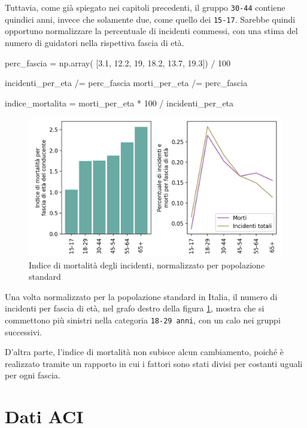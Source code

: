 \documentclass[a4paper,12pt]{report}
\newcommand{\columnstyle}[1]{\texttt{#1}}
\begin{document}
Tuttavia, come già spiegato nei capitoli precedenti, il gruppo \columnstyle{30-44} 
contiene quindici anni, invece che solamente due, come quello dei \columnstyle{15-17}. 
Sarebbe quindi opportuno 
normalizzare la percentuale di incidenti commessi, con una stima del numero di 
guidatori nella rispettiva fascia di età. 

\begin{code}
perc_fascia = np.array( [3.1, 12.2, 19, 18.2, 13.7, 19.3]) / 100

incidenti_per_eta /= perc_fascia
morti_per_eta /= perc_fascia

indice_mortalita = morti_per_eta * 100 / incidenti_per_eta
\end{code}

\begin{figure}
    \includegraphics[width=\linewidth]{../src/incidenti/incidenti_senza_coords/mortalita/indice_mort_norm.png}
    \caption{Indice di mortalità degli incidenti, normalizzato per popolazione standard}
    \label{fig:indice-mort-norm}
\end{figure}

Una volta normalizzato per la popolazione standard in Italia, il numero di incidenti per 
fascia di età, nel grafo destro della figura \ref{fig:indice-mort-norm}, mostra che  
si commettono più sinistri nella categoria \columnstyle{18-29 anni}, 
con un calo nei gruppi successivi. 

D'altra parte, l'indice di mortalità non subisce alcun cambiamento, 
poiché è realizzato tramite 
un rapporto in cui i fattori sono stati divisi per costanti uguali per ogni fascia. 

\section{Dati ACI}
\end{document}
